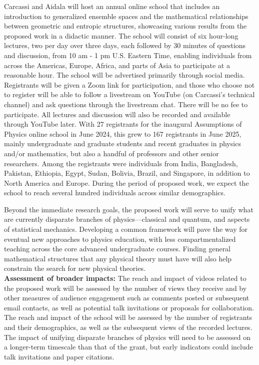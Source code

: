 Carcassi and Aidala will host an annual online school that includes an introduction to generalized ensemble spaces and the mathematical relationships between geometric and entropic structures, showcasing various results from the proposed work in a didactic manner.  The school will consist of six hour-long lectures, two per day over three days, each followed by 30 minutes of questions and discussion, from 10 am - 1 pm U.S. Eastern Time, enabling individuals from across the Americas, Europe, Africa, and parts of Asia to participate at a reasonable hour.  The school will be advertised primarily through social media.  Registrants will be given a Zoom link for participation, and those who choose not to register will be able to follow a livestream on YouTube (on Carcassi's technical channel) and ask questions through the livestream chat.  There will be no fee to participate.  All lectures and discussion will also be recorded and available through YouTube later. With 27 registrants for the inaugural Assumptions of Physics online school in June 2024, this grew to 167 registrants in June 2025, mainly undergraduate and graduate students and recent graduates in physics and/or mathematics, but also a handful of professors and other senior researchers.  Among the registrants were individuals from India, Bangladesh, Pakistan, Ethiopia, Egypt, Sudan, Bolivia, Brazil, and Singapore, in addition to North America and Europe. During the period of proposed work, we expect the school to reach several hundred individuals across similar demographics.    

Beyond the immediate research goals, the proposed work will serve to unify what are currently disparate branches of physics---classical and quantum, and aspects of statistical mechanics.  Developing a common framework will pave the way for eventual new approaches to physics education, with less compartmentalized teaching across the core advanced undergraduate courses.  Finding general mathematical structures that any physical theory must have will also help constrain the search for new physical theories.  \\

\noindent
\textbf{Assessment of broader impacts:}  The reach and impact of videos related to the proposed work will be assessed by the number of views they receive and by other measures of audience engagement such as comments posted or subsequent email contacts, as well as potential talk invitations or proposals for collaboration.  The reach and impact of the school will be assessed by the number of registrants and their demographics, as well as the subsequent views of the recorded lectures.  The impact of unifying disparate branches of physics will need to be assessed on a longer-term timescale than that of the grant, but early indicators could include talk invitations and paper citations. \\



